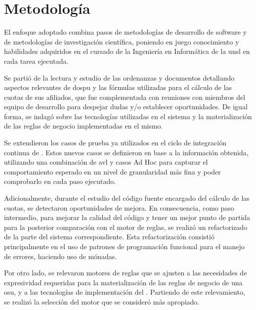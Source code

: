 \section{Metodología} \label{sec:metodologia}

El enfoque adoptado combina pasos de metodologías de desarrollo de software y de metodologías de investigación científica, poniendo en juego conocimiento y habilidades adquiridos en el cursado de la Ingeniería en Informática de la \acrshort{unsl} en cada tarea ejecutada.

Se partió de la lectura y estudio de las ordenanzas y documentos detallando aspectos relevantes de \acrshort{dospu} y las fórmulas utilizadas para el cálculo de las cuotas de sus afiliados, que fue complementada con reuniones con miembros del equipo de desarrollo {\SIDOSPU} para despejar dudas y/o establecer oportunidades. 
De igual forma, se indagó sobre las tecnologías utilizadas en el sistema y la materialización de las reglas de negocio implementadas en el mismo.

Se extendieron los casos de prueba ya utilizados en el ciclo de integración continua de {\SIDOSPU}.
Estos nuevos casos se definieron en base a la información obtenida, utilizando una combinación de \acrfull{avl} y casos Ad Hoc para capturar el comportamiento esperado en un nivel de granularidad más fina y poder comprobarlo en cada paso ejecutado.

Adicionalmente, durante el estudio del código fuente encargado del cálculo de las cuotas, se detectaron oportunidades de mejora. 
En consecuencia, como paso intermedio, para mejorar la calidad del código y tener un mejor punto de partida para la posterior comparación con el motor de reglas, se realizó un refactorizado de la parte del sistema correspondiente. 
Esta refactorización consistió principalmente en el uso de patrones de programación funcional para el manejo de errores, haciendo uso de mónadas.

Por otro lado, se relevaron motores de reglas que se ajusten a las necesidades de expresividad requeridas para la materialización de las reglas de negocio de una \acrshort{osu}, y a las tecnologías de implementación del {\SIDOSPU}. 
Partiendo de este relevamiento, se realizó la selección del motor que se consideró más apropiado.

